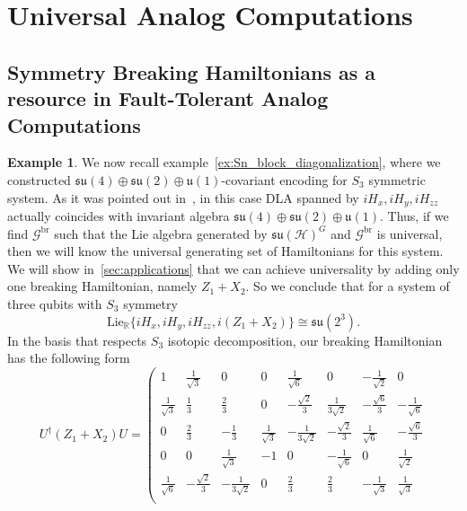 \documentclass[11pt,letterpaper]{article}
\newcounter{alg}
\theoremstyle{plain}
\theoremstyle{plain}
\theoremstyle{plain}
\theoremstyle{plain}
\theoremstyle{plain}
\theoremstyle{plain}
\newcommand{\HH}{\mathcal{H}}
\theoremstyle{plain}
\theoremstyle{definition}
\newtheorem{smexample}[smtheorem]{Example}
\theoremstyle{plain}
\begin{document}
\section{Universal Analog Computations}\label{sec:supple_Universal_comp}

\subsection{Symmetry Breaking Hamiltonians as a resource in Fault-Tolerant Analog Computations}

\begin{smexample}\label{ex:s3_breaking_not_block_diagonal}
We now recall example~\ref{ex:Sn_block_diagonalization}, where we constructed $\mathfrak{su}(4)\oplus\mathfrak{su}(2)\oplus\mathfrak{u}(1)$-covariant encoding for $S_3$ symmetric system.
As it was pointed out in~\cite{Albertini2018}, in this case DLA spanned by $iH_x, iH_y, iH_{zz}$ actually coincides with invariant algebra
$\mathfrak{su}(4)\oplus\mathfrak{su}(2)\oplus \mathfrak{u}(1)$. Thus, if we find 
$\mathcal{G}^{\text{br}}$ such that the Lie algebra generated by $\mathfrak{su}(\HH)^G$ and $\mathcal{G}^{\text{br}}$ is universal, then 
we will know the universal generating set of Hamiltonians for this system. We will show in~\ref{sec:applications} that we can achieve universality by adding only one breaking Hamiltonian, namely $Z_1+X_2$.
So we conclude that for a system of three qubits with $S_3$ symmetry
\[
    \mathrm{Lie}_{\mathbb{R}}\{iH_x, iH_y, iH_{zz}, i(Z_1+X_2)\}\cong \mathfrak{su}(2^3).
\]
In the basis that respects $S_3$ isotopic decomposition, our breaking Hamiltonian has the following form
\[
    U^{\dagger}\left(Z_1+X_2\right) U=\left(\begin{array}{cccccccc}
    1 & \frac{1}{\sqrt{3}} & 0 & 0 & \frac{1}{\sqrt{6}} & 0 & -\frac{1}{\sqrt{2}} & 0 \\
    \frac{1}{\sqrt{3}} & \frac{1}{3} & \frac{2}{3} & 0 & -\frac{\sqrt{2}}{3} & \frac{1}{3 \sqrt{2}} & -\frac{\sqrt{6}}{3} & -\frac{1}{\sqrt{6}} \\
    0 & \frac{2}{3} & -\frac{1}{3} & \frac{1}{\sqrt{3}} & -\frac{1}{3 \sqrt{2}} & -\frac{\sqrt{2}}{3} & \frac{1}{\sqrt{6}} & -\frac{\sqrt{6}}{3} \\
    0 & 0 & \frac{1}{\sqrt{3}} & -1 & 0 & -\frac{1}{\sqrt{6}} & 0 & \frac{1}{\sqrt{2}} \\
    \frac{1}{\sqrt{6}} & -\frac{\sqrt{2}}{3} & -\frac{1}{3 \sqrt{2}} & 0 & \frac{2}{3} & \frac{2}{3} & -\frac{1}{\sqrt{3}} & \frac{1}{\sqrt{3}} \\

\end{array}\]
\end{smexample}
\end{document}

